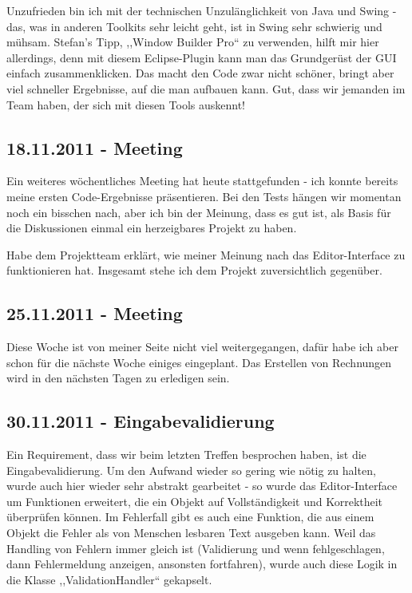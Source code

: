 \documentclass[11pt]{scrartcl}
\begin{document}
Unzufrieden bin ich mit der technischen Unzulänglichkeit von Java und Swing -
das, was in anderen Toolkits sehr leicht geht, ist in Swing sehr schwierig und
mühsam. Stefan's Tipp, ,,Window Builder Pro`` zu verwenden, hilft mir hier
allerdings, denn mit diesem Eclipse-Plugin kann man das Grundgerüst der GUI
einfach zusammenklicken. Das macht den Code zwar nicht schöner, bringt aber
viel schneller Ergebnisse, auf die man aufbauen kann. Gut, dass wir jemanden
im Team haben, der sich mit diesen Tools auskennt!


\subsection{18.11.2011 - Meeting}

Ein weiteres wöchentliches Meeting hat heute stattgefunden - ich konnte bereits
meine ersten Code-Ergebnisse präsentieren. Bei den Tests hängen wir momentan
noch ein bisschen nach, aber ich bin der Meinung, dass es gut ist, als Basis
für die Diskussionen einmal ein herzeigbares Projekt zu haben.

Habe dem Projektteam erklärt, wie meiner Meinung nach das Editor-Interface zu
funktionieren hat. Insgesamt stehe ich dem Projekt zuversichtlich gegenüber.


\subsection{25.11.2011 - Meeting}

Diese Woche ist von meiner Seite nicht viel weitergegangen, dafür habe ich aber
schon für die nächste Woche einiges eingeplant. Das Erstellen von Rechnungen
wird in den nächsten Tagen zu erledigen sein.


\subsection{30.11.2011 - Eingabevalidierung}

Ein Requirement, dass wir beim letzten Treffen besprochen haben, ist die
Eingabevalidierung. Um den Aufwand wieder so gering wie nötig zu halten, wurde
auch hier wieder sehr abstrakt gearbeitet - so wurde das Editor-Interface um
Funktionen erweitert, die ein Objekt auf Vollständigkeit und Korrektheit
überprüfen können. Im Fehlerfall gibt es auch eine Funktion, die aus einem
Objekt die Fehler als von Menschen lesbaren Text ausgeben kann. Weil das
Handling von Fehlern immer gleich ist (Validierung und wenn fehlgeschlagen,
dann Fehlermeldung anzeigen, ansonsten fortfahren), wurde auch diese Logik in
die Klasse ,,ValidationHandler`` gekapselt.
\end{document}
